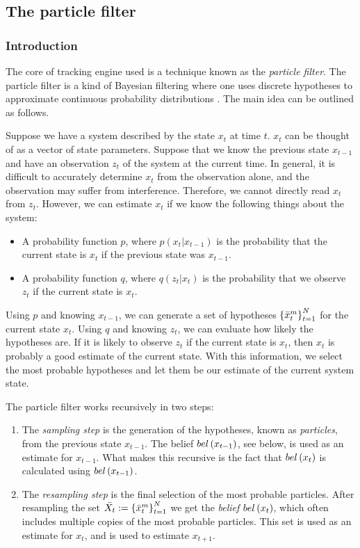 
\subsection{The particle filter}
\subsubsection{Introduction}
The core of tracking engine used is a technique known as the \emph{particle filter}. The particle filter is a kind of Bayesian filtering where one uses discrete hypotheses to approximate continuous probability distributions \cite{ProbRob}. The main idea can be outlined as follows.

Suppose we have a system described by the state $x_t$ at time $t$. $x_t$ can be thought of as a vector of state parameters. Suppose that we know the previous state $x_{t-1}$ and have an observation $z_t$ of the system at the current time. In general, it is difficult to accurately determine $x_t$ from the observation alone, and the observation may suffer from interference. Therefore, we cannot directly read $x_t$ from $z_t$. However, we can estimate $x_t$ if we know the following things about the system:

\begin{itemize}
\item A probability function $p$, where $p\left(x_t | x_{t-1}\right)$ is the probability that the current state is $x_t$ if the previous state was $x_{t-1}$.
\item A probability function $q$, where $q\left(z_t | x_t\right)$ is the probability that we observe $z_t$ if the current state is $x_t$.
\end{itemize}

Using $p$ and knowing $x_{t-1}$, we can generate a set of hypotheses $\left\{\bar{x}_{t}^{m}\right\}_{t=1}^{N}$ for the current state $x_t$. Using $q$ and knowing $z_t$, we can evaluate how likely the hypotheses are. If it is likely to observe $z_t$ if the current state is $x_t$, then $x_t$ is probably a good estimate of the current state. With this information, we select the most probable hypotheses and let them be our estimate of the current system state.

The particle filter works recursively in two steps:

\begin{enumerate}
\item The \emph{sampling step} is the generation of the hypotheses, known as \emph{particles}, from the previous state $x_{t-1}$. The belief $bel\left(x_{t-1}\right)$, see below, is used as an estimate for $x_{t-1}$. What makes this recursive is the fact that $bel\left(x_t\right)$ is calculated using $bel\left(x_{t-1}\right)$.

\item The \emph{resampling step} is the final selection of the most probable particles. After resampling the set $\bar{X_t} := \left\{\bar{x}_{t}^{m}\right\}_{t=1}^{N}$ we get the \emph{belief} $bel\left(x_t\right)$, which often includes multiple copies of the most probable particles. This set is used as an estimate for $x_t$, and is used to estimate $x_{t+1}$.
\end{enumerate}

